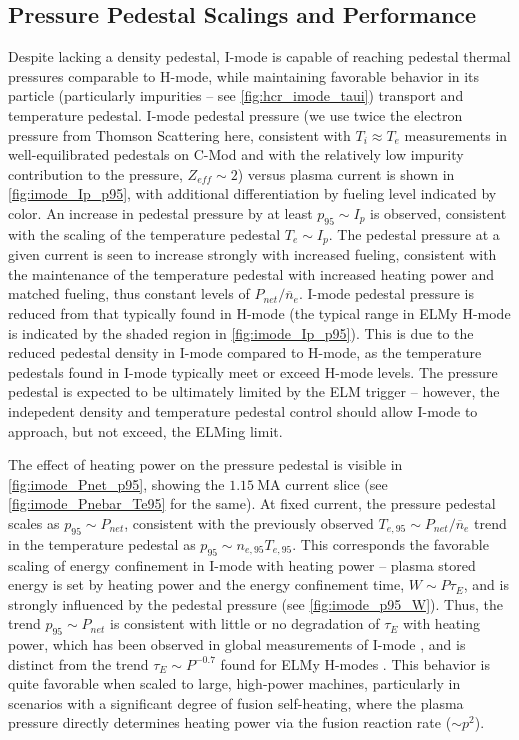 \subsection{Pressure Pedestal Scalings and Performance}\label{subsec:imode_pres}

Despite lacking a density pedestal, I-mode is capable of reaching pedestal thermal pressures comparable to H-mode, while maintaining favorable behavior  in its particle (particularly impurities -- see \cref{fig:hcr_imode_taui}) transport and temperature pedestal.  I-mode pedestal pressure (we use twice the electron pressure from Thomson Scattering here, consistent with $T_i \approx T_e$ measurements in well-equilibrated pedestals on C-Mod \cite{Hubbard2011} and with the relatively low impurity contribution to the pressure, $Z_{eff} \sim 2$) versus plasma current is shown in \cref{fig:imode_Ip_p95}, with additional differentiation by fueling level indicated by color.  An increase in pedestal pressure by at least $p_{95} \sim I_p$ is observed, consistent with the scaling of the temperature pedestal $T_e \sim I_p$.  The pedestal pressure at a given current is seen to increase strongly with increased fueling, consistent with the maintenance of the temperature pedestal with increased heating power and matched fueling, thus constant levels of $P_{net}/\overline{n}_e$.  I-mode pedestal pressure is reduced from that typically found in H-mode (the typical range in ELMy H-mode is indicated by the shaded region in \cref{fig:imode_Ip_p95}).  This is due to the reduced pedestal density in I-mode compared to H-mode, as the temperature pedestals found in I-mode typically meet or exceed H-mode levels.  The pressure pedestal is expected to be ultimately limited by the ELM trigger -- however, the indepedent density and temperature pedestal control should allow I-mode to approach, but not exceed, the ELMing limit.

The effect of heating power on the pressure pedestal is visible in \cref{fig:imode_Pnet_p95}, showing the $\SI{1.15}{\mega\ampere}$ current slice (see \cref{fig:imode_Pnebar_Te95} for the same).  At fixed current, the pressure pedestal scales as $p_{95} \sim P_{net}$, consistent with the previously observed $T_{e,95} \sim P_{net}/\overline{n}_e$ trend in the temperature pedestal as $p_{95} \sim n_{e,95} T_{e,95}$.  This corresponds the favorable scaling of energy confinement in I-mode with heating power -- plasma stored energy is set by heating power and the energy confinement time, $W \sim P \tau_E$, and is strongly influenced by the pedestal pressure (see \cref{fig:imode_p95_W}).  Thus, the trend $p_{95} \sim P_{net}$ is consistent with little or no degradation of $\tau_E$ with heating power, which has been observed in global measurements of I-mode \cite{Dominguez2012,Whyte2010}, and is distinct from the trend $\tau_E \sim P^{-0.7}$ found for ELMy H-modes \cite{ITER1999}.  This behavior is quite favorable when scaled to large, high-power machines, particularly in scenarios with a significant degree of fusion self-heating, where the plasma pressure directly determines heating power via the fusion reaction rate ($\sim p^2$).

